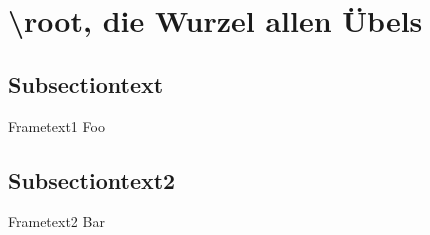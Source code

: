 \section[\textbackslash root]{\textbackslash root, die Wurzel allen Übels}
\subsection{Subsectiontext}
\begin{frame}{Frametext1}
Foo
\end{frame}

\subsection{Subsectiontext2}
\begin{frame}{Frametext2}
Bar
\end{frame}